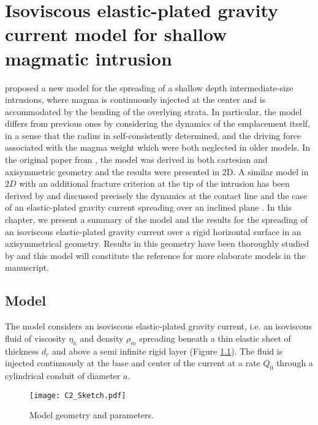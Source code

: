 \chapter{Isoviscous elastic-plated  gravity current model  for shallow
  magmatic intrusion}

\label{chap2} 
\minitoc

\citet{Michaut:2011kg} proposed  a new  model for  the spreading  of a
shallow   depth   intermediate-size   intrusions,   where   magma   is
continuously injected at the center and is accommodated by the bending
of  the  overlying strata.   In  particular,  the model  differs  from
previous ones by  considering the dynamics of  the emplacement itself,
in a  sense that the  radius in self-consistently determined,  and the
driving  force  associated  with  the magma  weight  which  were  both
neglected   in   older   models.    In   the   original   paper   from
\citet{Michaut:2011kg}, the  model was  derived in both  cartesian and
axisymmetric geometry and the results  were presented in 2D. A similar
model in $2D$ with an additional  fracture criterion at the tip of the
intrusion    has   been    derived   by    \citet{Bunger:2011cb}   and
\citet{Anonymous:QWXp_4JV}  discussed precisely  the  dynamics at  the
contact  line  and  the  case of  an  elastic-plated  gravity  current
spreading over an inclined  plane \citep{Anonymous:QWXp_4JV}.  In this
chapter, we  present a summary  of the model  and the results  for the
spreading of an isoviscous elastic-plated gravity current over a rigid
horizontal  surface in  an axisymmetrical  geometry.  Results  in this
geometry  have been  thoroughly studied  by \citet{Lister:2013ia}  and
this model will constitute the  reference for more elaborate models in
the manuscript.

\section{Model}
\label{C2-sec:model}

The model considers an isoviscous elastic-plated gravity current, i.e.
an  isoviscous  fluid  of  viscosity  $\eta_h$  and  density  $\rho_m$
spreading beneath a thin elastic sheet  of thickness $d_c$ and above a
semi infinite rigid layer \citep{Michaut:2011kg,Bunger:2011cb} (Figure
\ref{C2-Sketch}).  The fluid is injected  continuously at the base and
center of the current at a rate $Q_0$ through a cylindrical conduit of
diameter $a$.

\begin{figure}[htbp]
  \begin{center}
    \graphicspath{ {/Users/thorey/Documents/These/Manuscript/Figure/Chapter2/} }
    \texttt{[image: C2\_Sketch.pdf]}
    \caption{Model geometry and parameters.}
    \label{C2-Sketch}
  \end{center}
\end{figure}

